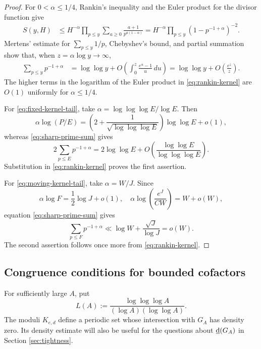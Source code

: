 \documentclass[11pt,letterpaper,reqno]{amsart}
\numberwithin{equation}{section}
\theoremstyle{remark}
\newcommand{\lowerdens}{\underline{\textup{d}}}
\renewcommand{\leq}{\leqslant}
\renewcommand{\geq}{\geqslant}
\begin{document}
\begin{proof}
For $0<\alpha\leq1/4$, Rankin's inequality and the Euler product for the
divisor function give
\begin{align}
 S(y,H)
 &\leq H^{-\alpha}
 \prod_{p\leq y}\sum_{a\geq0}
 \frac{a+1}{p^{a(1-\alpha)}}
 =H^{-\alpha}
 \prod_{p\leq y}(1-p^{-1+\alpha})^{-2}.
 \label{eq:rankin-kernel}
\end{align}
Mertens' estimate for $\sum_{p\leq y}1/p$, Chebyshev's bound, and partial
summation show that, when $z=\alpha\log y\to\infty$,
\begin{align}
 \sum_{p\leq y}p^{-1+\alpha}
 &=\log\log y+
 O\left(\int_0^z\frac{e^u-1}{u}\,du\right)
 =\log\log y+O\left(\frac{e^z}{z}\right).
 \label{eq:sharp-prime-sum}
\end{align}
The higher terms in the logarithm of the Euler product in
\eqref{eq:rankin-kernel} are $O(1)$ uniformly for $\alpha\leq1/4$.

For \eqref{eq:fixed-kernel-tail}, take
$\alpha=\log\log\log E/\log E$. Then
\[
 \alpha\log(P/E)
 =\left(2+\frac1{\sqrt{\log\log\log E}}\right)\log\log E+o(1),
\]
whereas \eqref{eq:sharp-prime-sum} gives
\[
 2\sum_{p\leq E}p^{-1+\alpha}
 =2\log\log E+O\left(\frac{\log\log E}{\log\log\log E}\right).
\]
Substitution in \eqref{eq:rankin-kernel} proves the first assertion.

For \eqref{eq:moving-kernel-tail}, take $\alpha=W/J$. Since
\[
 \alpha\log F=\frac12\log J+o(1),
 \quad
 \alpha\log\left(\frac{e^J}{CW}\right)=W+o(W),
\]
equation \eqref{eq:sharp-prime-sum} gives
\[
 \sum_{p\leq F}p^{-1+\alpha}
 \ll\log W+\frac{\sqrt J}{\log J}=o(W).
\]
The second assertion follows once more from \eqref{eq:rankin-kernel}.
\end{proof}

\subsection{Congruence conditions for bounded cofactors}

For sufficiently large $A$, put
\[
 L(A):=\frac{\log\log\log A}{(\log A)(\log\log A)}.
\]
The moduli $K_{e,d}$ define a periodic set whose intersection with $G_A$
has density zero. Its density estimate will also be useful for the questions
about $\lowerdens(G_A)$ in Section \ref{sec:tightness}.
\end{document}
